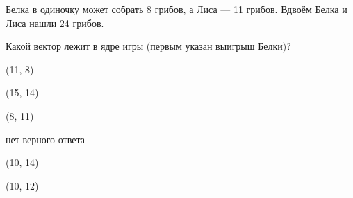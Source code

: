
\begin{question}
Белка в одиночку может собрать 8 грибов, а Лиса --- 11 грибов.
Вдвоём Белка и Лиса нашли 24 грибов.

Какой вектор лежит в ядре игры (первым указан выигрыш Белки)?
\begin{answerlist}
  \item (11, 8)
  \item (15, 14)
  \item (8, 11)
  \item нет верного ответа
  \item (10, 14)
  \item (10, 12)
\end{answerlist}
\end{question}


